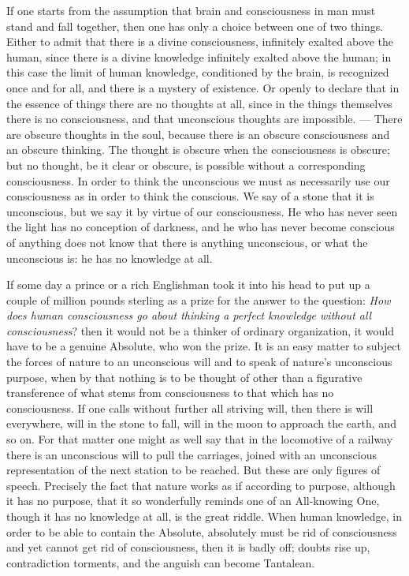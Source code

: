 \documentclass[12pt,a4paper,openany]{book}
\newcommand{\opage}[1]{\marginnote{\footnotesize\textit{[#1]}}}
\begin{document}
If one starts from the assumption that brain and
consciousness in man must stand and fall together,
then one has only a choice between one of two things. Either
to admit that there is a divine consciousness,
\setcounter{footnote}{0}%
\opage{10}infinitely exalted above the human, since
there is a divine knowledge infinitely exalted
above the human; in this case the limit of human knowledge, conditioned by the brain,
is recognized once and for all, and there is a mystery of existence.
Or openly to declare that in the essence of things there are no
thoughts at all, since in the things themselves there is no consciousness,
and that unconscious thoughts are impossible. --- There
are obscure thoughts in the soul, because there is an obscure
consciousness and an obscure thinking. The thought is obscure
when the consciousness is obscure; but no thought, be it
clear or obscure, is possible without a corresponding consciousness.
In order to think the unconscious we must as
necessarily use our consciousness as in order to think the
conscious. We say of a stone that it is unconscious, but
we say it by virtue of our consciousness. He who has never
seen the light has no conception of darkness, and
he who has never become conscious of anything does not know
that there is anything unconscious, or what the unconscious is:
he has no knowledge at all.

If some day a prince or a rich Englishman took
it into his head to put up a couple of million pounds sterling as
a prize for the answer to the question: \emph{How does
human consciousness go about
thinking a perfect knowledge without all consciousness}?
then it would not be a thinker of ordinary organization,
it would have to be a genuine Absolute, who won
the prize. It is an easy matter to subject the forces of nature
to an unconscious will and to speak of nature's unconscious
purpose, when by that nothing is to be thought of other than a
figurative transference of what stems from consciousness
to that which has no consciousness. If one calls without
\setcounter{footnote}{0}%
\opage{11}further all striving will, then there is will everywhere, will
in the stone to fall, will in the moon to approach the
earth, and so on. For that matter one might as well
say that in the locomotive of a railway there is an unconscious
will to pull the carriages, joined with an unconscious
representation of the next station to be reached.
But these are only figures of speech. Precisely the fact
that nature works as if according to purpose, although it has
no purpose, that it so wonderfully reminds one of an All-knowing One,
though it has no knowledge at all, is the great
riddle. When human knowledge, in order to be able to
contain the Absolute, absolutely must be rid of consciousness
and yet cannot get rid of consciousness, then it is badly
off; doubts rise up, contradiction torments, and the anguish
can become Tantalean.
\end{document}
